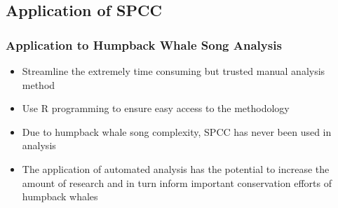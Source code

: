 \documentclass[12pt]{beamer}\usepackage[]{graphicx}\usepackage[]{color}
\begin{document}
\subsection{Application of SPCC}
\begin{frame}
\frametitle{Application to Humpback Whale Song Analysis}
\begin{itemize}
\item<1-> Streamline the extremely time consuming but trusted manual analysis method
\item<2-> Use R programming to ensure easy access to the methodology
\item<3-> Due to humpback whale song complexity, SPCC has never been used in analysis
\item<4-> The application of automated analysis has the potential to increase the amount of research and in turn inform important conservation efforts of humpback whales
\end{itemize}
\end{frame}







\end{document}
